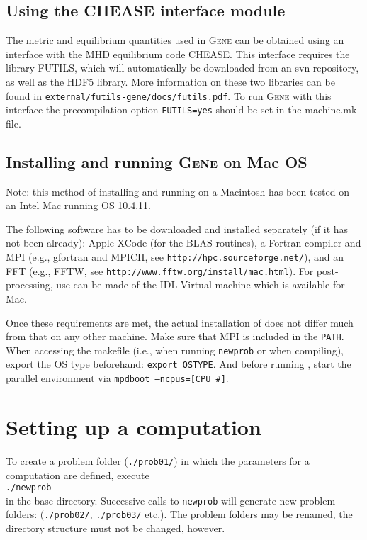 \documentclass[12pt]{article}
\begin{document}
\subsection{Using the CHEASE interface module}
The metric and equilibrium quantities used in \textsc{Gene} can be obtained using an
interface with the MHD equilibrium code CHEASE. This interface requires the
library FUTILS, which will automatically be downloaded from an svn repository, as well
as the HDF5 library. More information on these two libraries can be found  in
\texttt{external/futils-gene/docs/futils.pdf}. To run \textsc{Gene} with this interface
the precompilation option \texttt{FUTILS=yes} should be set in the
machine.mk file.

\subsection{Installing and running \textsc{Gene} on Mac OS}

Note: this method of installing and running \gene on a Macintosh has
been tested on an Intel Mac running OS 10.4.11.

The following software has to be downloaded and installed separately
(if it has not been already): Apple XCode (for the BLAS routines), a
Fortran compiler and MPI (e.g., gfortran and MPICH, see
\texttt{http://hpc.sourceforge.net/}), and an FFT (e.g., FFTW, see
\texttt{http://www.fftw.org/install/mac.html}). For post-processing, use
can be made of the IDL Virtual machine which is available for Mac.

Once these requirements are met, the actual installation of \gene does
not differ much from that on any other machine. Make sure that MPI is
included in the \texttt{PATH}. When accessing the makefile (i.e., when
running \texttt{newprob} or when compiling), export the OS type
beforehand: \texttt{export OSTYPE}. And before running \gene, start
the parallel environment via \texttt{mpdboot --ncpus=[CPU \#]}.

\newpage


\section{Setting up a computation}

To create a problem folder (\texttt{./prob01/}) in which the parameters for a computation are defined,
execute \\
\qquad\verb|./newprob| \\
in the \gene base directory. Successive calls to \verb|newprob| will generate new problem folders:
(\texttt{./prob02/}, \texttt{./prob03/} etc.). The problem folders may be renamed, the directory
structure must not be changed, however.
\end{document}
